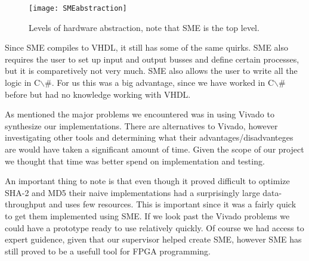 \documentclass[a4paper, openany]{book}
\begin{document}
\begin{abstact}
\begin{figure}[H]
  \centering
  \texttt{[image: SMEabstraction]}
  \caption{Levels of hardware abstraction, note that SME is the top level.}
\end{figure}

Since SME compiles to VHDL, it still has some of the same quirks. SME also requires the user to set up input and output busses and define certain processes,
but it is comparetively not very much. SME also allows the user to write all the logic in C$\backslash$#.
For us this was a big advantage, since we have worked in C$\backslash$# before but had no knowledge working with VHDL.

As mentioned the major problems we encountered was in using Vivado to synthesize our implementations.
There are alternatives to Vivado, however investigating other tools and determining what their advantages/disadvanteges are would have taken a significant amount of time.
Given the scope of our project we thought that time was better spend on implementation and testing.

An important thing to note is that even though it proved difficult to optimize SHA-2 and MD5 their naive implementations had a
surprisingly large data-throughput and uses few resources. This is important since it was a fairly quick to get them implemented using SME.
If we look past the Vivado problems we could have a prototype ready to use relatively quickly.
Of course we had access to expert guidence, given that our supervisor helped create SME, however SME has still proved to be a usefull tool for FPGA programming.

\end{abstact}
\end{document}
